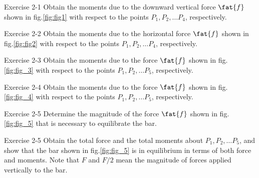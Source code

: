 Exercise 2-1
Obtain the moments due to the downward vertical force $\fat{f}$ shown in fig.\ref{fig:fig1} 
with respect to the points $P_1,P_2,\dots P_4$, respectively.

Exercise 2-2
Obtain the moments due to the horizontal force $\fat{f}$ shown in fig.\ref{fig:fig2} 
with respect to the points $P_1,P_2,\dots P_4$, respectively.

Exercise 2-3
Obtain the moments due to the force $\fat{f}$ shown in fig.\ref{fig:fig_3} 
with respect to the points $P_1,P_2,\dots P_5$, respectively.

Exercise 2-4
Obtain the moments due to the force $\fat{f}$ shown in fig.\ref{fig:fig_4} 
with respect to the points $P_1,P_2,\dots P_5$, respectively.

Exercise 2-5
Determine the magnitude of the force $\fat{f}$ shown in fig.\ref{fig:fig_5} 
that is necessary to equilibrate the bar. 

Exercise 2-5
Obtain the total force and the total moments about $P_1, P_2,\dots P_5$, 
and show that the bar shown in fig.\ref{fig:fig_5} is in equilibrium 
in terms of both force and moments. 
Note that $F$ and $F/2$ mean the magnitude of forces applied vertically to the bar.




   
